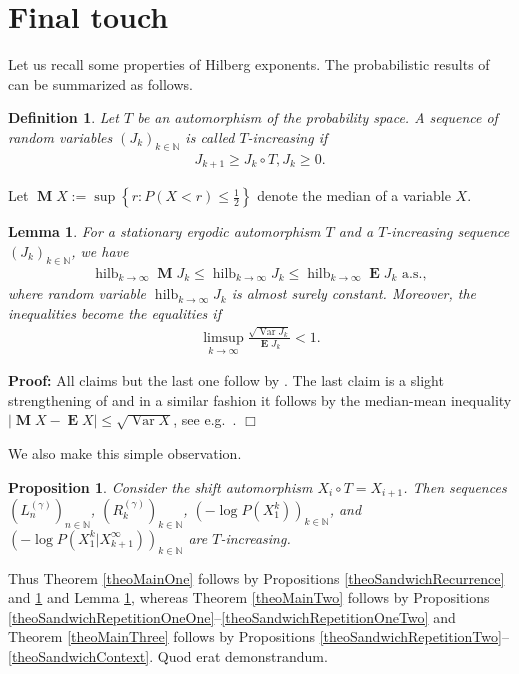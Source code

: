 \documentclass[a4paper,12pt]{article}
\newcommand{\abs}[1]{\left| #1 \right|}
\newcommand{\klam}[1]{\left\{ #1 \right\}}
\DeclareMathOperator*{\hilberg}{hilb}
\DeclareMathOperator{\var}{Var}
\DeclareMathOperator{\mean}{\mathbf{E}}
\DeclareMathOperator{\median}{\mathbf{M}}
\newtheorem{definition}{Definition}
\newtheorem{proposition}{Proposition}
\newtheorem{lemma}{Lemma}
\newenvironment*{proof}{\begin{trivlist}\item[]
\noindent\textbf{Proof:}}{$\Box$\par\end{trivlist}}
\begin{document}
\section{Final touch}
\label{secFinal}

Let us recall some properties of Hilberg exponents.  The probabilistic
results of \citep[Section 8.1]{Debowski21} can be summarized as
follows.
\begin{definition}
  Let $T$ be an automorphism of the probability space.  A sequence of
  random variables $(J_k)_{k\in\mathbb{N}}$ is called $T$-increasing
  if
  \begin{align}
    J_{k+1}\ge J_k\circ T,J_k\ge 0.
  \end{align}
\end{definition}
Let $\median X:=\sup \klam{r: P(X<r)\le \frac{1}{2}}$ denote the
median of a variable $X$.
\begin{lemma}
  \label{theoHilberg}
  For a stationary ergodic automorphism $T$ and a $T$-increasing
  sequence $(J_k)_{k\in\mathbb{N}}$, we have
  \begin{align}
    \hilberg_{k\rightarrow\infty} \median J_k
    \le \hilberg_{k\rightarrow\infty} J_k 
    \le \hilberg_{k\rightarrow\infty} \mean J_k
    \text{ a.s.}, 
  \end{align}
  where random variable $\hilberg_{k\rightarrow\infty} J_k$ is almost
  surely constant. Moreover, the inequalities become the equalities if
  \begin{align}
    \limsup_{k\rightarrow\infty} \frac{\sqrt{\var J_k}}{\mean J_k}<1.
  \end{align}
\end{lemma}
\begin{proof}
  All claims but the last one follow by \citep[Theorems 8.3--8.5]{Debowski21}.
  The last claim is a slight strengthening of \citep[Theorem
  8.6]{Debowski21} and in a similar fashion it follows by the
  median-mean inequality $\abs{\median X-\mean X}\le \sqrt{\var X}$,
  see e.g.\ \citep[Theorem 3.17]{Debowski21}.
\end{proof}

We also make this simple observation.
\begin{proposition}
  \label{theoIncreasing}
  Consider the shift automorphism $X_i\circ T=X_{i+1}$. Then sequences
  $(L^{(\gamma)}_n)_{n\in\mathbb{N}}$,
  $(R^{(\gamma)}_k)_{k\in\mathbb{N}}$,
  $(-\log P(X_1^k))_{k\in\mathbb{N}}$, and
  $(-\log P(X_1^k|X_{k+1}^\infty))_{k\in\mathbb{N}}$ are
  $T$-increasing.
\end{proposition}
Thus Theorem \ref{theoMainOne} follows by Propositions
\ref{theoSandwichRecurrence} and \ref{theoIncreasing} and Lemma
\ref{theoHilberg}, whereas Theorem \ref{theoMainTwo} follows by
Propositions
\ref{theoSandwichRepetitionOneOne}--\ref{theoSandwichRepetitionOneTwo}
and Theorem \ref{theoMainThree} follows by Propositions
\ref{theoSandwichRepetitionTwo}--\ref{theoSandwichContext}. Quod erat
demonstrandum.

% 

%


\end{document}
